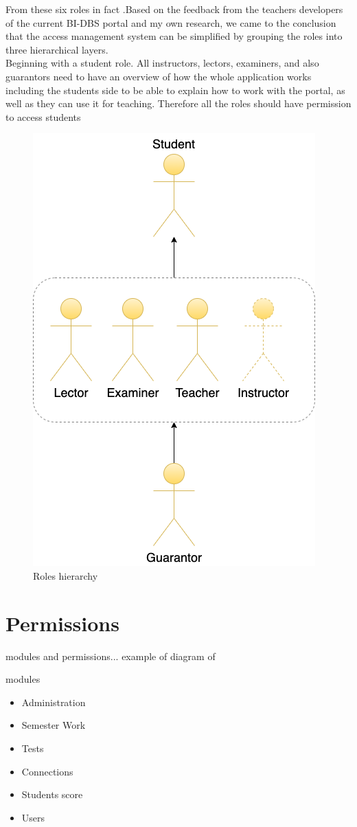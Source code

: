 \noindent From these six roles in fact .Based on the feedback from the teachers developers of the current BI-DBS portal and my own research, we came to the conclusion that the access management system can be simplified by grouping the roles into three hierarchical layers.\\

Beginning with a student role. All instructors, lectors, examiners, and also guarantors need to have an overview of how the whole application works including the students side to be able to explain how to work with the portal, as well as they can use it for teaching. Therefore all the roles should have permission to access students 



\begin{figure}[h]
\centering
\includegraphics[scale=0.57]{../png/role.png}
\caption{Roles hierarchy}\label{picture:roles}
\end{figure}

\newpage
\section{Permissions} modules and permissions... example of 
 diagram of 


modules
\begin{itemize}
    \item Administration
    \item Semester Work
    \item Tests
    \item Connections
    \item Students score
    \item Users
\end{itemize}